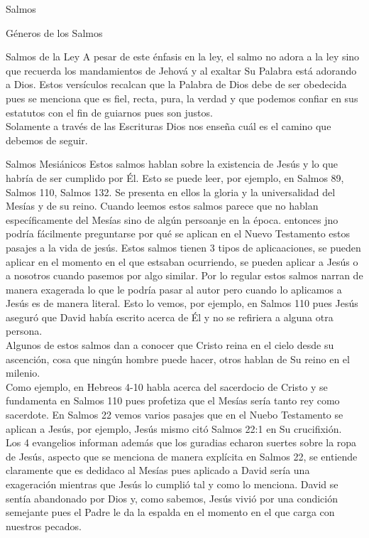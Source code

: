 \begin{section}{Salmos}
\begin{subsection}{Géneros de los Salmos}
\begin{subsubsection}{Salmos de la Ley}
			A pesar de este énfasis en la ley, el salmo no adora a la ley sino que recuerda los mandamientos de Jehová y al exaltar Su Palabra está adorando a Dios. Estos versículos recalcan que la Palabra de Dios debe de ser obedecida pues se menciona que es fiel, recta, pura, la verdad y que podemos confiar en sus estatutos con el fin de guiarnos pues son justos.\\
			Solamente a través de las Escrituras Dios nos enseña cuál es el camino que debemos de seguir.
		\end{subsubsection}
		\begin{subsubsection}{Salmos Mesiánicos}
			Estos salmos hablan sobre la existencia de Jesús y lo que habría de ser cumplido por Él. Esto se puede leer, por ejemplo, en Salmos 89, Salmos 110, Salmos 132. Se presenta en ellos la gloria y la universalidad del Mesías y de su reino. Cuando leemos estos salmos parece que no hablan específicamente del Mesías sino de algún persoanje en la época. entonces jno podría fácilmente preguntarse por qué se aplican en el Nuevo Testamento estos pasajes a la vida de jesús. Estos salmos tienen 3 tipos de aplicaaciones, se pueden aplicar en el momento en el que estsaban ocurriendo, se pueden aplicar a Jesús o a nosotros cuando pasemos por algo similar.
			\newpage
			Por lo regular estos salmos narran de manera exagerada lo que le podría pasar al autor pero cuando lo aplicamos a Jesús es de manera literal. Esto lo vemos, por ejemplo, en Salmos 110 pues  Jesús aseguró que David había escrito acerca de Él y no se refiriera a alguna otra persona.\\
			Algunos de estos salmos dan a conocer que Cristo reina en el cielo desde su ascención, cosa que ningún hombre puede hacer, otros hablan de Su reino en el milenio.\\
			Como ejemplo, en Hebreos 4-10 habla acerca del sacerdocio de Cristo y se fundamenta en Salmos 110 pues profetiza que el Mesías sería tanto rey como sacerdote. En Salmos 22 vemos varios pasajes que en el Nuebo Testamento se aplican a Jesús, por ejemplo, Jesús mismo citó Salmos 22:1 en Su crucifixión.\\
			Los 4 evangelios informan además que los guradias echaron suertes sobre la ropa de Jesús, aspecto que se menciona de manera explícita en Salmos 22, se entiende claramente que es dedidaco al Mesías pues aplicado a David sería una exageración mientras que Jesús lo cumplió tal y como lo menciona. David se sentía abandonado por Dios y, como sabemos, Jesús vivió por una condición semejante pues el Padre le da la espalda en el momento en el que carga con nuestros pecados.\\

\end{subsubsection}
\end{subsection}
\end{section}
